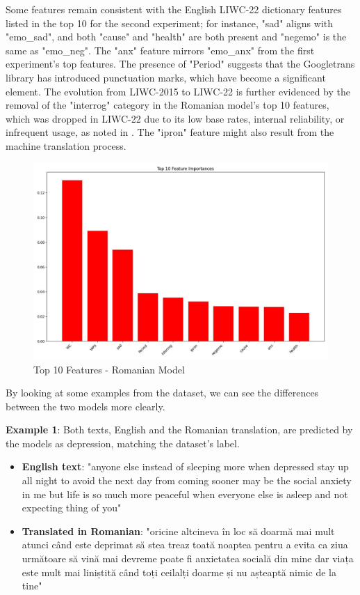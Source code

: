 Some features remain consistent with the English LIWC-22 dictionary features listed in the top 10 for the second experiment; for instance, "sad" aligns with "emo\_sad", and both "cause" and "health" are both present and "negemo" is the same as "emo\_neg". The "anx" feature mirrors "emo\_anx" from the first experiment’s top features. The presence of "Period" suggests that the Googletrans library has introduced punctuation marks, which have become a significant element. The evolution from LIWC-2015 to LIWC-22 is further evidenced by the removal of the "interrog" category in the Romanian model’s top 10 features, which was dropped in LIWC-22 due to its low base rates, internal reliability, or infrequent usage, as noted in \cite{boyd2022development}. The "ipron" feature might also result from the machine translation process.

\begin{figure}[htbp]
	\centering
		\includegraphics[scale=0.5]{LaTeX Bachelor Thesis Depression Signs Detection/figures/metrics/experimentRomanian/top10features.jpg}
	\caption{Top 10 Features - Romanian Model}
	\label{top10FeaturesRomanianExperiment}
\end{figure}

By looking at some examples from the dataset, we can see the differences between the two models more clearly.

\textbf{Example 1}: Both texts, English and the Romanian translation, are predicted by the models as depression, matching the dataset's label.
\begin{itemize}
    \item 
\textbf{English text}: "anyone else instead of sleeping more when depressed stay up all night to avoid the next day from coming sooner may be the social anxiety in me but life is so much more peaceful when everyone else is asleep and not expecting thing of you" 
\item
\textbf{Translated in Romanian}: "oricine altcineva în loc să doarmă mai mult atunci când este deprimat să stea treaz toată noaptea pentru a evita ca ziua următoare să vină mai devreme poate fi anxietatea socială din mine dar viața este mult mai liniștită când toți ceilalți doarme și nu așteaptă nimic de la tine" 
\end{itemize}

